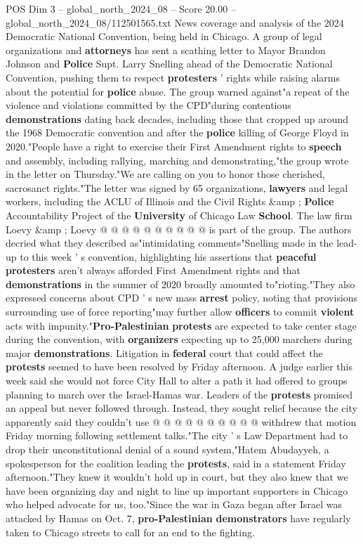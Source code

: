 \begin{textsample}{POS Dim 3 – global\_north\_2024\_08 – Score 20.00 – global\_north\_2024\_08/112501565.txt}  \label{ex:f3_pos_139}
News coverage and analysis of the 2024 Democratic National Convention, being held in Chicago.
A group of legal organizations and \textbf{attorneys} has sent a scathing letter to Mayor Brandon Johnson and \textbf{Police} Supt.
Larry Snelling ahead of the Democratic National Convention, pushing them to respect \textbf{protesters} ' rights while raising alarms about the potential for \textbf{police} abuse.
The group warned against"a repeat of the violence and violations committed by the CPD"during contentious \textbf{demonstrations} dating back decades, including those that cropped up around the 1968 Democratic convention and after the \textbf{police} killing of George Floyd in 2020."People have a right to exercise their First Amendment rights to \textbf{speech} and assembly, including rallying, marching and demonstrating,"the group wrote in the letter on Thursday."We are calling on you to honor those cherished, sacrosanct rights."The letter was signed by 65 organizations, \textbf{lawyers} and legal workers, including the ACLU of Illinois and the Civil Rights \&amp ; \textbf{Police} Accountability Project of the \textbf{University} of Chicago Law \textbf{School}.
The law firm Loevy \&amp ; Loevy @ @ @ @ @ @ @ @ @ @ is part of the group.
The authors decried what they described as"intimidating comments"Snelling made in the lead-up to this week ' s convention, highlighting his assertions that \textbf{peaceful} \textbf{protesters} aren't always afforded First Amendment rights and that \textbf{demonstrations} in the summer of 2020 broadly amounted to"rioting."They also expressed concerns about CPD ' s new mass \textbf{arrest} policy, noting that provisions surrounding use of force reporting"may further allow \textbf{officers} to commit \textbf{violent} acts with impunity."\textbf{Pro-Palestinian} \textbf{protests} are expected to take center stage during the convention, with \textbf{organizers} expecting up to 25,000 marchers during major \textbf{demonstrations}.
Litigation in \textbf{federal} court that could affect the \textbf{protests} seemed to have been resolved by Friday afternoon.
A judge earlier this week said she would not force City Hall to alter a path it had offered to groups planning to march over the Israel-Hamas war.
Leaders of the \textbf{protests} promised an appeal but never followed through.
Instead, they sought relief because the city apparently said they couldn't use @ @ @ @ @ @ @ @ @ @ withdrew that motion Friday morning following settlement talks."The city ' s Law Department had to drop their unconstitutional denial of a sound system,"Hatem Abudayyeh, a spokesperson for the coalition leading the \textbf{protests}, said in a statement Friday afternoon."They knew it wouldn't hold up in court, but they also knew that we have been organizing day and night to line up important supporters in Chicago who helped advocate for us, too."Since the war in Gaza began after Israel was attacked by Hamas on Oct. 7, \textbf{pro-Palestinian} \textbf{demonstrators} have regularly taken to Chicago streets to call for an end to the fighting.

\end{textsample}
